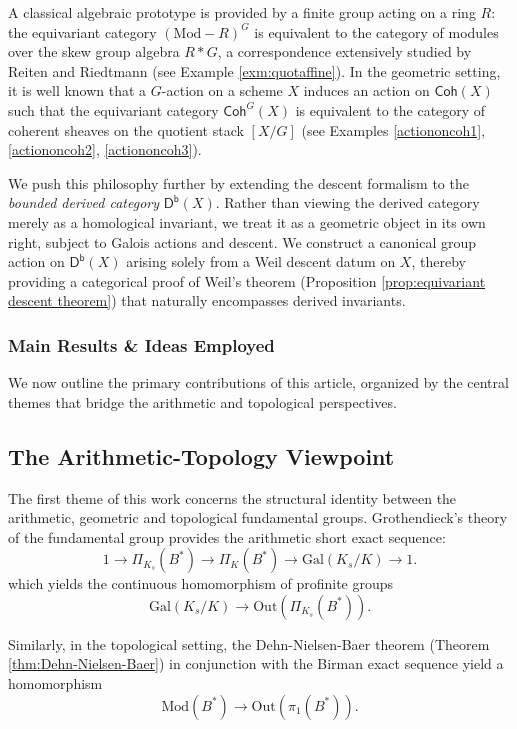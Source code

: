\documentclass[10pt]{amsart}
\theoremstyle{definition}
\newcommand{\Gal}{{ \mathrm{Gal}}}
\begin{document}
A classical algebraic prototype is provided by a finite group acting on a ring $R$: the equivariant category $(\mathrm{Mod-}R)^G$ is equivalent to the category of modules over the skew group algebra $R*G$, a correspondence extensively studied by Reiten and Riedtmann \cite{ReitenRiedtmann} (see Example \ref{exm:quotaffine}). In the geometric setting, it is well known that a $G$-action on a scheme $X$ induces an action on $\mathsf{Coh}(X)$ such that the equivariant category $\mathsf{Coh}^G(X)$ is equivalent to the category of coherent sheaves on the quotient stack $[X/G]$ (see Examples \ref{actiononcoh1}, \ref{actiononcoh2}, \ref{actiononcoh3}).

We push this philosophy further by extending the descent formalism to the \textit{bounded derived category} $\mathsf{D^b}(X)$. Rather than viewing the derived category merely as a homological invariant, we treat it as a geometric object in its own right, subject to Galois actions and descent. We construct a canonical group action on $\mathsf{D^b}(X)$ arising solely from a Weil descent datum on $X$, thereby providing a categorical proof of Weil's theorem (Proposition \ref{prop:equivariant descent theorem}) that naturally encompasses derived invariants.

\subsubsection*{Main Results \& Ideas Employed}
We now outline the primary contributions of this article, organized by the central themes that bridge the arithmetic and topological perspectives.


\subsection*{The Arithmetic-Topology Viewpoint}

The first theme of this work concerns the structural identity between the arithmetic, geometric and topological fundamental groups. Grothendieck's theory of the fundamental group provides the arithmetic short exact sequence:
\begin{equation*}
1 \to \Pi_{K_s}(B^*) \to \Pi_K(B^*) \to \Gal(K_s/K) \to 1.
\end{equation*}
which yields the continuous homomorphism of profinite groups
\[\Gal(K_s/K) \rightarrow \mathrm{Out}(\Pi_{K_s}(B^*)).\]

Similarly, in the topological setting, the Dehn-Nielsen-Baer theorem (Theorem \ref{thm:Dehn-Nielsen-Baer}) in conjunction with the Birman exact sequence yield a homomorphism
\[\mathrm{Mod}(B^*) \rightarrow \mathrm{Out}(\pi_1(B^*)).\]
\end{document}
